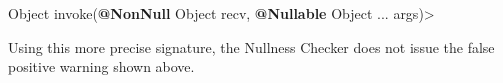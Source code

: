 \quad {} Object invoke({\bfseries @NonNull} Object recv, {\bfseries @Nullable} Object ... args)>

Using this more precise signature, the Nullness Checker does not issue the false positive warning shown above.

